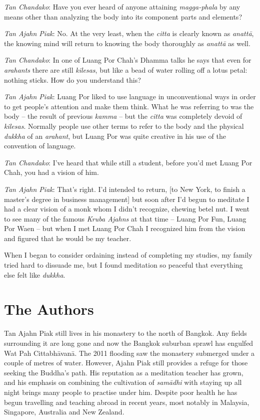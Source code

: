 \emph{Tan Chandako}: Have you ever heard of anyone attaining
\emph{magga-phala} by any means other than analyzing the body into its
component parts and elements? 

\emph{Tan Ajahn Piak}: No. At the very least, when the \emph{citta} is
clearly known as \emph{anattā}, the knowing mind will return to knowing
the body thoroughly as \emph{anattā} as well. 

\emph{Tan Chandako}: In one of Luang Por Chah's Dhamma talks he says
that even for \emph{arahants} there are still \emph{kilesas}, but like a
bead of water rolling off a lotus petal: nothing sticks. How do you
understand this? 

\emph{Tan Ajahn Piak}: Luang Por liked to use language in unconventional
ways in order to get people's attention and make them think. What he was
referring to was the body -- the result of previous \emph{kamma} --
but the \emph{citta} was completely devoid of \emph{kilesas}. Normally
people use other terms to refer to the body and the physical
\emph{dukkha} of an \emph{arahant}, but Luang Por was quite creative in
his use of the convention of language. 

\emph{Tan Chandako}: I've heard that while still a student, before you'd
met Luang Por Chah, you had a vision of him. 

\emph{Tan Ajahn Piak}: That's right. I'd intended to return, [to New
York, to finish a master's degree in business management] but soon
after I'd begun to meditate I had a clear vision of a monk whom I didn't
recognize, chewing betel nut. I went to see many of the famous
\emph{Kruba Ajahns} at that time -- Luang Por Fun, Luang Por Waen --
but when I met Luang Por Chah I recognized him from the vision and
figured that he would be my teacher. 

When I began to consider ordaining instead of completing my studies, my
family tried hard to dissuade me, but I found meditation so peaceful
that everything else felt like \emph{dukkha}. 

\dividerRule

\section{The Authors}

Tan Ajahn Piak still lives in his monastery to the north of
Bangkok. Any fields surrounding it are long gone and now the Bangkok
suburban sprawl has engulfed Wat Pah Cittabhāvanā. The 2011 flooding saw
the monastery submerged under a couple of metres of water. However, 
Ajahn Piak still provides a refuge for those seeking the Buddha's path. 
His reputation as a meditation teacher has grown, and his emphasis on
combining the cultivation of \emph{samādhi} with staying up all night brings
many people to practise under him. Despite poor health he has begun
travelling and teaching abroad in recent years, most notably in
Malaysia, Singapore, Australia and New Zealand.


